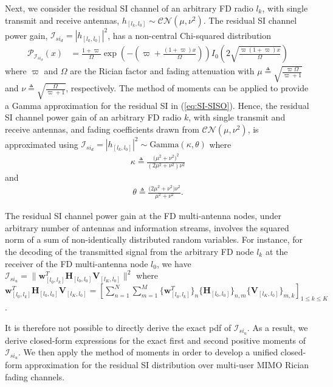 \documentclass[onecolumn]{IEEEtran}
\begin{document}
Next, we consider the residual SI channel of an arbitrary FD radio $l_{k}$, with single transmit and receive antennas, $h_{[l_{k},l_{0}]} \sim \mathcal{C} \mathcal{N} (\mu,\nu^2)$. The residual SI channel power gain, $\mathcal{I}_{si_{d}} = | h_{[l_{k},l_{0}]} |^{2}$, has a non-central Chi-squared distribution 
\begin{align}
\mathcal{P}_{\mathcal{I}_{si_{d}}} (x) & = \tfrac{1 + \varpi}{\Omega} \exp \left( - \left( \varpi + \tfrac{(1 + \varpi) x}{\Omega} \right) \right) I_{0} \left(2 \sqrt{ \tfrac{\varpi (1 + \varpi) x}{\Omega} }\right)
\label{eq:SI-SISO}
\end{align}
where $\varpi$ and $\Omega$ are the Rician factor and fading attenuation with $\mu \triangleq \sqrt{\frac{\varpi \Omega}{\varpi + 1}}$ and $\nu \triangleq \sqrt{\frac{\Omega}{\varpi+1}}$, respectively. The method of moments can be applied to provide a Gamma approximation for the residual SI in (\ref{eq:SI-SISO}). Hence, the residual SI channel power gain of an arbitrary FD radio $k$, with single transmit and receive antennas, and fading coefficients drawn from $\mathcal{C} \mathcal{N} (\mu,\nu^2)$, is approximated using $\mathcal{I}_{si_{d}} = | h_{[l_{k},l_{0}]} |^{2} \sim \text{Gamma} \left( \kappa,\theta \right)$ where
\begin{align}
\kappa \triangleq \tfrac{ \big( \mu^2+\nu^2 \big)^2}{\left( 2 \mu^2 + \nu^2 \right) \nu^2 } 
\end{align}
and
\begin{align}
\theta \triangleq \tfrac{\big( 2 \mu^2 + \nu^2 \big) \nu^2 }{\mu^2+\nu^2}.
\end{align}

The residual SI channel power gain at the FD multi-antenna nodes, under arbitrary number of antennas and information streams, involves the squared norm of a sum of non-identically distributed random variables. For instance, for the decoding of the transmitted signal from the arbitrary FD node $l_{k}$ at the receiver of the FD multi-antenna node $l_{0}$, we have $\mathcal{I}_{si_{u}} = \| \boldsymbol{w}^{T}_{[l_{0},l_{k}]} \boldsymbol{H}_{[l_{0},l_{0}]} \boldsymbol{V}_{[l_{K},l_{0}]} \|^{2}$ where $\boldsymbol{w}^{T}_{[l_{0},l_{k}]} \boldsymbol{H}_{[l_{0},l_{0}]} \boldsymbol{V}_{[l_{K},l_{0}]} = [ \sum^{N}_{n = 1} \sum^{M}_{m = 1} \{ \boldsymbol{w}^{T}_{[l_{0},l_{k}]} \}_{n} \{ \boldsymbol{H}_{[l_{0},l_{0}]} \}_{n,m} \{ \boldsymbol{V}_{[l_{K},l_{0}]}  \}_{m,k} ]_{1 \leq k \leq K}$.

It is therefore not possible to directly derive the exact pdf of $\mathcal{I}_{si_{u}}$. As a result, we derive closed-form expressions for the exact first and second positive moments of $\mathcal{I}_{si_{u}}$. We then apply the method of moments in order to develop a unified closed-form approximation for the residual SI distribution over multi-user MIMO Rician fading channels.
\end{document}

